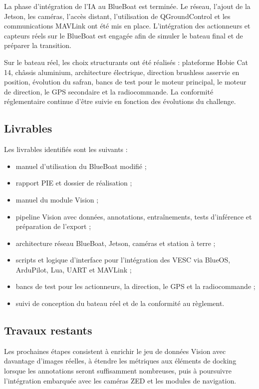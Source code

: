 \documentclass[11pt,letterpaper]{article}
\begin{document}
La phase d'intégration de l'IA au BlueBoat est terminée. Le réseau, l'ajout de la Jetson, les caméras, l'accès distant, l'utilisation de QGroundControl et les communications MAVLink ont été mis en place. L'intégration des actionneurs et capteurs réels sur le BlueBoat est engagée afin de simuler le bateau final et de préparer la transition.

Sur le bateau réel, les choix structurants ont été réalisés : plateforme Hobie Cat 14, châssis aluminium, architecture électrique, direction brushless asservie en position, évolution du safran, bancs de test pour le moteur principal, le moteur de direction, le GPS secondaire et la radiocommande. La conformité réglementaire continue d'être suivie en fonction des évolutions du challenge.

\subsection{Livrables}

Les livrables identifiés sont les suivants :

\begin{itemize}
    \item manuel d'utilisation du BlueBoat modifié ;
    \item rapport PIE et dossier de réalisation ;
    \item manuel du module Vision ;
    \item pipeline Vision avec données, annotations, entraînements, tests d'inférence et préparation de l'export ;
    \item architecture réseau BlueBoat, Jetson, caméras et station à terre ;
    \item scripts et logique d'interface pour l'intégration des VESC via BlueOS, ArduPilot, Lua, UART et MAVLink ;
    \item bancs de test pour les actionneurs, la direction, le GPS et la radiocommande ;
    \item suivi de conception du bateau réel et de la conformité au règlement.
\end{itemize}

\subsection{Travaux restants}

Les prochaines étapes consistent à enrichir le jeu de données Vision avec davantage d'images réelles, à étendre les métriques aux éléments de docking lorsque les annotations seront suffisamment nombreuses, puis à poursuivre l'intégration embarquée avec les caméras ZED et les modules de navigation.
\end{document}
